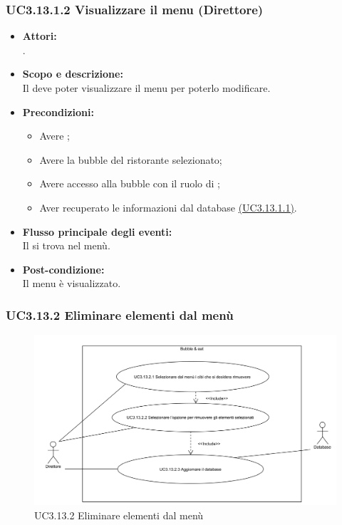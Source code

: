\subsubsection{UC3.13.1.2 Visualizzare il menu (Direttore)} \label{UC3.13.1.2}

\begin{itemize}
	\item \textbf{Attori:}
	\\.
	\item \textbf{Scopo e descrizione:} 
	\\Il {} deve poter visualizzare il menu per poterlo modificare.
	\item \textbf{Precondizioni:}
	\begin{itemize}
		\item Avere ;
		\item Avere la bubble del ristorante selezionato;
		\item Avere accesso alla bubble con il ruolo di ;
		\item Aver recuperato le informazioni dal database \hyperref[UC3.13.1.1]{(UC3.13.1.1)}.
	\end{itemize}
	\item \textbf{Flusso principale degli eventi:}
	\\Il {} si trova nel menù.
	\item \textbf{Post-condizione:}
	\\Il menu è visualizzato.
\end{itemize}

\subsubsection{UC3.13.2 Eliminare elementi dal menù} \label{UC3.13.2}

\begin{figure}[H]
	\centering
	\includegraphics[width=15cm]{../../documenti/AnalisiDeiRequisiti/Diagrammi_img/uc3_13_2.png}
	\caption{UC3.13.2 Eliminare elementi dal menù}
\end{figure}

